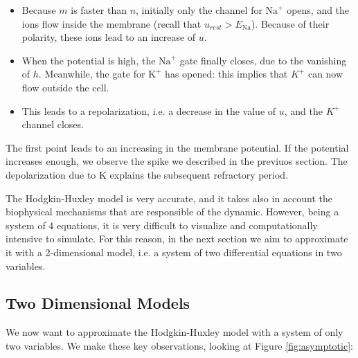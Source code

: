 \documentclass[oneside]{book}
\theoremstyle{definition}
\theoremstyle{plain}
\begin{document}
\begin{itemize}
    \item Because $m$ is faster than $n$, initially only the channel for $\mathrm{Na}^+$ opens, and the ions flow inside the membrane (recall that $u_{rest}>E_{\mathrm{Na}}$). Because of their polarity, these ions lead to an increase of $u$.
  
    \item When the potential is high, the $\mathrm{Na}^+$ gate finally closes, due to the vanishing of $h$. Meanwhile, the gate for $\mathrm{K}^+$ has opened: this implies that $K^+$ can now flow outside the cell.
  
    \item This leads to a repolarization, i.e. a decrease in the value of $u$, and the $K^+$ channel closes.
\end{itemize}

The first point leads to an increasing in the membrane potential. If the potential increases enough, we observe the spike we described in the previuos section.
The depolarization due to K explains the subsequent refractory period.

The Hodgkin-Huxley model is very accurate, and it takes also in account the biophysical mechanisms that are responsible of the dynamic.
However, being a system of 4 equations, it is very difficult to visualize and computationally intensive to simulate. For this reason, in the next section we aim to approximate it with a 2-dimensional model, i.e. a system of two differential equations in two variables.

\subsection{Two Dimensional Models}

We now want to approximate the Hodgkin-Huxley model with a system of only two variables. We make these key observations, looking at Figure \ref{fig:asymptotic}:
\end{document}
